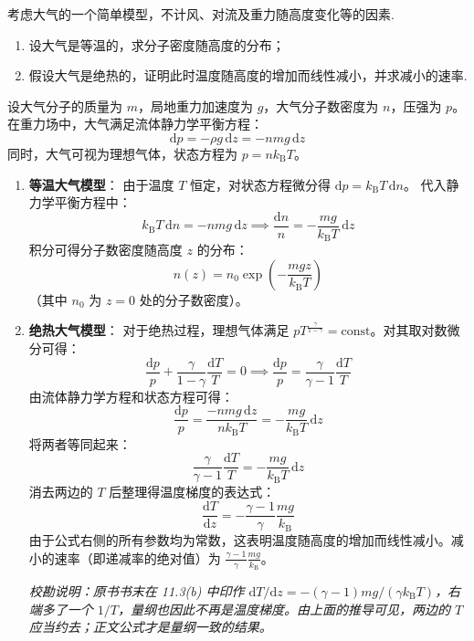 \begin{exercise}\label{ex:11.3}
考虑大气的一个简单模型，不计风、对流及重力随高度变化等的因素.
\begin{enumerate}
  \item[(a)] 设大气是等温的，求分子密度随高度的分布；
  \item[(b)] 假设大气是绝热的，证明此时温度随高度的增加而线性减小，并求减小的速率.
\end{enumerate}
\end{exercise}
\begin{solution}
设大气分子的质量为 $m$，局地重力加速度为 $g$，大气分子数密度为 $n$，压强为 $p$。在重力场中，大气满足流体静力学平衡方程：
$$ \mathrm{d}p = -\rho g \, \mathrm{d}z = -n m g \, \mathrm{d}z $$
同时，大气可视为理想气体，状态方程为 $p = n k_{\mathrm{B}} T$。

\begin{enumerate}
    \item[(a)] \textbf{等温大气模型}：
    由于温度 $T$ 恒定，对状态方程微分得 $\mathrm{d}p = k_{\mathrm{B}} T \, \mathrm{d}n$。
    代入静力学平衡方程中：
    $$ k_{\mathrm{B}} T \, \mathrm{d}n = -n m g \, \mathrm{d}z \implies \frac{\mathrm{d}n}{n} = - \frac{mg}{k_{\mathrm{B}} T} \, \mathrm{d}z $$
    积分可得分子数密度随高度 $z$ 的分布：
    $$ n(z) = n_0 \exp\left(- \frac{mgz}{k_{\mathrm{B}} T}\right) $$
    （其中 $n_0$ 为 $z=0$ 处的分子数密度）。

    \item[(b)] \textbf{绝热大气模型}：
    对于绝热过程，理想气体满足 $p T^{\frac{\gamma}{1-\gamma}} = \mathrm{const}$。对其取对数微分可得：
    $$ \frac{\mathrm{d}p}{p} + \frac{\gamma}{1-\gamma} \frac{\mathrm{d}T}{T} = 0 \implies \frac{\mathrm{d}p}{p} = \frac{\gamma}{\gamma - 1} \frac{\mathrm{d}T}{T} $$
    由流体静力学方程和状态方程可得：
    $$ \frac{\mathrm{d}p}{p} = \frac{-n m g \, \mathrm{d}z}{n k_{\mathrm{B}} T} = - \frac{mg}{k_{\mathrm{B}} T} \, \mathrm{d}z $$
    将两者等同起来：
    $$ \frac{\gamma}{\gamma - 1} \frac{\mathrm{d}T}{T} = - \frac{mg}{k_{\mathrm{B}} T} \, \mathrm{d}z $$
    消去两边的 $T$ 后整理得温度梯度的表达式：
    $$ \frac{\mathrm{d}T}{\mathrm{d}z} = - \frac{\gamma - 1}{\gamma} \frac{mg}{k_{\mathrm{B}}} $$
    由于公式右侧的所有参数均为常数，这表明温度随高度的增加而线性减小。减小的速率（即递减率的绝对值）为 $\frac{\gamma - 1}{\gamma} \frac{mg}{k_{\mathrm{B}}}$。

    \textit{校勘说明：原书书末在 11.3(b) 中印作 $\mathrm{d}T/\mathrm{d}z=-(\gamma-1)mg/(\gamma k_{\mathrm{B}}T)$，右端多了一个 $1/T$，量纲也因此不再是温度梯度。由上面的推导可见，两边的 $T$ 应当约去；正文公式才是量纲一致的结果。}
\end{enumerate}
\end{solution}

